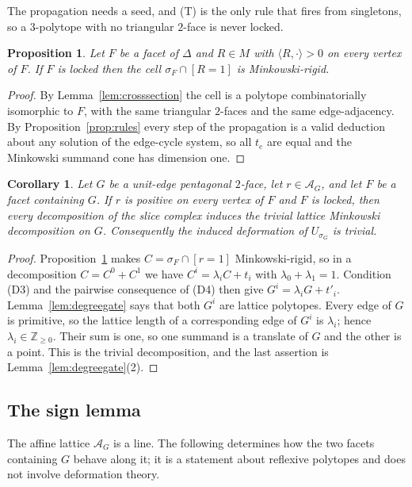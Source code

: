 \documentclass[11pt]{amsart}
\newtheorem{proposition}[theorem]{Proposition}
\newtheorem{corollary}[theorem]{Corollary}
\theoremstyle{definition}
\theoremstyle{remark}
\theoremstyle{plain}
\newcommand{\ZZ}{\mathbb{Z}}
\newcommand{\cA}{\mathcal{A}}
\begin{document}
The propagation needs a seed, and (T) is the only rule that fires from
singletons, so a $3$-polytope with no triangular $2$-face is never locked.

\begin{proposition}\label{prop:locked}
Let $F$ be a facet of $\Delta$ and $R \in M$ with
$\langle R, \cdot\rangle > 0$ on every vertex of $F$.  If $F$ is locked then
the cell $\sigma_F \cap [R=1]$ is Minkowski-rigid.
\end{proposition}

\begin{proof}
By Lemma~\ref{lem:crosssection} the cell is a polytope combinatorially
isomorphic to $F$, with the same triangular $2$-faces and the same
edge-adjacency.  By Proposition~\ref{prop:rules} every step of the propagation
is a valid deduction about any solution of the edge-cycle system, so all
$t_e$ are equal and the Minkowski summand cone has dimension one.
\end{proof}

\begin{corollary}\label{cor:lockedrel}
Let $G$ be a unit-edge pentagonal $2$-face, let $r\in\cA_G$, and let $F$ be a
facet containing $G$.  If $r$ is positive on every vertex of $F$ and $F$ is
locked, then every decomposition of the slice complex induces the trivial
lattice Minkowski decomposition on $G$.  Consequently the induced deformation
of $U_{\sigma_G}$ is trivial.
\end{corollary}

\begin{proof}
Proposition~\ref{prop:locked} makes
$C=\sigma_F\cap[r=1]$ Minkowski-rigid, so in a decomposition
$C=C^0+C^1$ we have $C^i=\lambda_iC+t_i$ with
$\lambda_0+\lambda_1=1$.  Condition (D3) and the pairwise consequence of (D4)
then give
$G^i=\lambda_iG+t'_i$.  Lemma~\ref{lem:degreegate} says that both $G^i$ are
lattice polytopes.  Every edge of $G$ is primitive, so the lattice length of a
corresponding edge of $G^i$ is $\lambda_i$; hence
$\lambda_i\in\ZZ_{\ge0}$.  Their sum is one, so one summand is a translate of
$G$ and the other is a point.  This is the trivial decomposition, and the last
assertion is Lemma~\ref{lem:degreegate}(2).
\end{proof}

\subsection{The sign lemma}

The affine lattice $\cA_G$ is a line.  The following determines how the two
facets containing $G$ behave along it; it is a statement about reflexive
polytopes and does not involve deformation theory.
\end{document}
